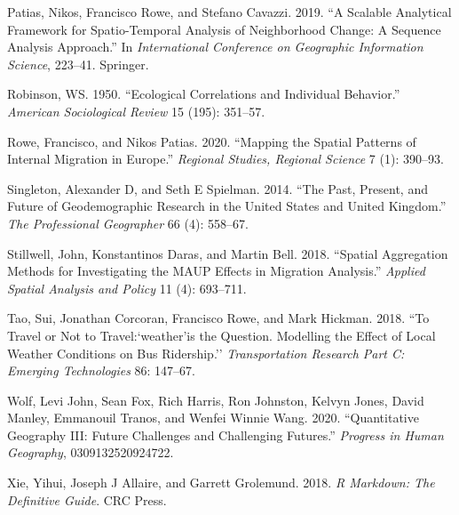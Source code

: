 \documentclass[
  letterpaper,
  DIV=11,
  numbers=noendperiod]{scrreprt}
\newlength{\cslhangindent}
\newlength{\cslentryspacingunit} %
\newenvironment{CSLReferences}[2] %
 {%
  \setlength{\parindent}{0pt}
  \ifodd #1
  \let\oldpar\par
  \def\par{\hangindent=\cslhangindent\oldpar}
  \fi
  \setlength{\parskip}{#2\cslentryspacingunit}
 }%
 {}
\begin{document}
\begin{CSLReferences}{1}{0}
\leavevmode{}%
Patias, Nikos, Francisco Rowe, and Stefano Cavazzi. 2019. {``A Scalable
Analytical Framework for Spatio-Temporal Analysis of Neighborhood
Change: A Sequence Analysis Approach.''} In \emph{International
Conference on Geographic Information Science}, 223--41. Springer.

\leavevmode{}%
Robinson, WS. 1950. {``Ecological Correlations and Individual
Behavior.''} \emph{American Sociological Review} 15 (195): 351--57.

\leavevmode{}%
Rowe, Francisco, and Nikos Patias. 2020. {``Mapping the Spatial Patterns
of Internal Migration in Europe.''} \emph{Regional Studies, Regional
Science} 7 (1): 390--93.

\leavevmode{}%
Singleton, Alexander D, and Seth E Spielman. 2014. {``The Past, Present,
and Future of Geodemographic Research in the United States and United
Kingdom.''} \emph{The Professional Geographer} 66 (4): 558--67.

\leavevmode{}%
Stillwell, John, Konstantinos Daras, and Martin Bell. 2018. {``Spatial
Aggregation Methods for Investigating the MAUP Effects in Migration
Analysis.''} \emph{Applied Spatial Analysis and Policy} 11 (4):
693--711.

\leavevmode{}%
Tao, Sui, Jonathan Corcoran, Francisco Rowe, and Mark Hickman. 2018.
{``To Travel or Not to Travel:`weather'is the Question. Modelling the
Effect of Local Weather Conditions on Bus Ridership.''}
\emph{Transportation Research Part C: Emerging Technologies} 86:
147--67.

\leavevmode{}%
Wolf, Levi John, Sean Fox, Rich Harris, Ron Johnston, Kelvyn Jones,
David Manley, Emmanouil Tranos, and Wenfei Winnie Wang. 2020.
{``Quantitative Geography III: Future Challenges and Challenging
Futures.''} \emph{Progress in Human Geography}, 0309132520924722.

\leavevmode{}%
Xie, Yihui, Joseph J Allaire, and Garrett Grolemund. 2018. \emph{R
Markdown: The Definitive Guide}. CRC Press.

\end{CSLReferences}
\end{document}
